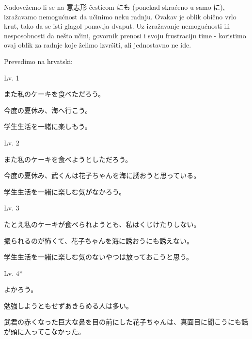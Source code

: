 	
	Nadovežemo li se na 意志形 česticom にも (ponekad skraćeno u samo に), izražavamo nemogućnost da učinimo neku radnju.
	Ovakav je oblik obično vrlo krut, tako da se isti glagol ponavlja dvaput.
	Uz izražavanje nemogućnosti ili nesposobnosti da nešto učini, govornik prenosi i svoju frustraciju time - koristimo ovaj oblik za radnje koje želimo izvršiti, ali jednostavno ne ide.
	
	\begin{reibun}
	\end{reibun}
	
	\newpage
	
	\noindent
	Prevedimo na hrvatski:
	
	\begin{mondai}{Lv. 1}
		\item また私のケーキを食べただろう。
		\item 今度の夏休み、海へ行こう。
		\item 学生生活を一緒に楽しもう。
	\end{mondai}

	\begin{mondai}{Lv. 2}
		\item また私のケーキを食べようとしただろう。
		\item 今度の夏休み、武くんは花子ちゃんを海に誘おうと思っている。
		\item 学生生活を一緒に楽しむ気がなかろう。
	\end{mondai}

	\begin{mondai}{Lv. 3}
		\item たとえ私のケーキが食べられようとも、私はくじけたりしない。
		\item 振られるのが怖くて、花子ちゃんを海に誘おうにも誘えない。
		\item 学生生活を一緒に楽しむ気のないやつは放っておこうと思う。
	\end{mondai}

	\begin{mondai}{Lv. 4*}
		\item よかろう。
		\item 勉強しようともせずあきらめる人は多い。
		\item 武君の赤くなった巨大な鼻を目の前にした\footnotemark[6]花子ちゃんは、真面目に聞こうにも話が頭に入ってこなかった。
	\end{mondai}

